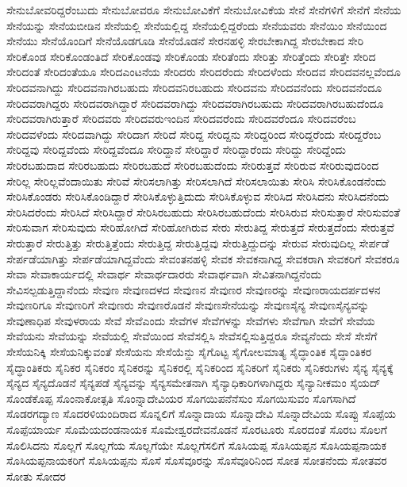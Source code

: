 {ಸೇನುಬೋವರಿದ್ದರೆಂಬುದು
ಸೇನುಬೋವರೂ
ಸೇನುಬೋವಿಕೆಗೆ
ಸೇನುಬೋವಿಕೆಯ
ಸೇನೆ
ಸೇನೆಗಳಿಗೆ
ಸೇನೆಗೆ
ಸೇನೆಯ
ಸೇನೆಯನ್ನು
ಸೇನೆಯಬೀಡಿನ
ಸೇನೆಯಲ್ಲಿ
ಸೇನೆಯಲ್ಲಿದ್ದ
ಸೇನೆಯಲ್ಲಿದ್ದರೆಂದು
ಸೇನೆಯವರು
ಸೇನೆಯಿಂ
ಸೇನೆಯಿಂದ
ಸೇನೆಯು
ಸೇನೆಯೊಂದಿಗೆ
ಸೇನೆಯೊಡಗೂಡಿ
ಸೇನೆಯೊಡನೆ
ಸೇರನಹಳ್ಳಿ
ಸೇರಬೇಕಾಗಿದ್ದ
ಸೇರಬೇಕಾದ
ಸೇರಿ
ಸೇರಿಕೊಂಡ
ಸೇರಿಕೊಂಡಂತಿದೆ
ಸೇರಿಕೊಂಡವು
ಸೇರಿಕೊಂಡು
ಸೇರಿತೆಂದು
ಸೇರಿತ್ತು
ಸೇರಿತ್ತೆಂದು
ಸೇರಿತ್ತೇ
ಸೇರಿದ
ಸೇರಿದಂತೆ
ಸೇರಿದಂತೆಯೂ
ಸೇರಿದಎಂಟನೆಯ
ಸೇರಿದರು
ಸೇರಿದರೆಂದು
ಸೇರಿದಳೆಂದು
ಸೇರಿದವ
ಸೇರಿದವನಲ್ಲವೆಂದೂ
ಸೇರಿದವನಾಗಿದ್ದು
ಸೇರಿದವನಾಗಿರಬಹುದು
ಸೇರಿದವನಿರಬಹುದು
ಸೇರಿದವನು
ಸೇರಿದವನೆಂದು
ಸೇರಿದವನೆಂದೂ
ಸೇರಿದವರಾಗಿದ್ದರು
ಸೇರಿದವರಾಗಿದ್ದಾರೆ
ಸೇರಿದವರಾಗಿದ್ದು
ಸೇರಿದವರಾಗಿರಬಹುದು
ಸೇರಿದವರಾಗಿರಬಹುದೆಂದೂ
ಸೇರಿದವರಾಗಿರುತ್ತಾರೆ
ಸೇರಿದವರು
ಸೇರಿದವರುಇಂದಿನ
ಸೇರಿದವರೆಂದು
ಸೇರಿದವರೆಂದೂ
ಸೇರಿದವರೆಂಬ
ಸೇರಿದವಳೆಂದು
ಸೇರಿದವಾಗಿದ್ದು
ಸೇರಿದಾಗ
ಸೇರಿದೆ
ಸೇರಿದ್ದ
ಸೇರಿದ್ದನು
ಸೇರಿದ್ದರಿಂದ
ಸೇರಿದ್ದರೆಂದು
ಸೇರಿದ್ದರೆಂಬ
ಸೇರಿದ್ದವು
ಸೇರಿದ್ದವೆಂದು
ಸೇರಿದ್ದವೆಂದೂ
ಸೇರಿದ್ದಾನೆ
ಸೇರಿದ್ದಾರೆ
ಸೇರಿದ್ದಾರೆಂದು
ಸೇರಿದ್ದು
ಸೇರಿದ್ದೆಂದು
ಸೇರಿರಬಹುದಾದ
ಸೇರಿರಬಹುದು
ಸೇರಿರಬಹುದೆ
ಸೇರಿರಬಹುದೆಂದು
ಸೇರಿರುತ್ತವೆ
ಸೇರಿರುವ
ಸೇರಿರುವುದರಿಂದ
ಸೇರಿಲ್ಲ
ಸೇರಿಲ್ಲವೆಂದಾಯಿತು
ಸೇರಿವೆ
ಸೇರಿಸಲಾಗಿತ್ತು
ಸೇರಿಸಲಾಗಿದೆ
ಸೇರಿಸಲಾಯಿತು
ಸೇರಿಸಿ
ಸೇರಿಸಿಕೊಂಡನೆಂದು
ಸೇರಿಸಿಕೊಂಡರು
ಸೇರಿಸಿಕೊಂಡಿದ್ದಾರೆ
ಸೇರಿಸಿಕೊಳ್ಳುತ್ತಿದುದು
ಸೇರಿಸಿಕೊಳ್ಳುವ
ಸೇರಿಸಿದ
ಸೇರಿಸಿದನು
ಸೇರಿಸಿದನೆಂದು
ಸೇರಿಸಿದರೆಂದು
ಸೇರಿಸಿದೆ
ಸೇರಿಸಿದ್ದಾರೆ
ಸೇರಿಸಿರಬಹುದು
ಸೇರಿಸಿರಬಹುದೆಂದು
ಸೇರಿಸಿರುವ
ಸೇರಿಸುತ್ತಾರೆ
ಸೇರಿಸುವಂತೆ
ಸೇರಿಸುವಾಗ
ಸೇರಿಸುವುದು
ಸೇರಿಹೋಗಿದೆ
ಸೇರಿಹೋಗಿರುವ
ಸೇರು
ಸೇರುತಿದ್ದ
ಸೇರುತ್ತದೆ
ಸೇರುತ್ತದೆಂದು
ಸೇರುತ್ತವೆ
ಸೇರುತ್ತಾರೆ
ಸೇರುತ್ತಿತ್ತು
ಸೇರುತ್ತಿತ್ತೆಂದು
ಸೇರುತ್ತಿದ್ದ
ಸೇರುತ್ತಿದ್ದವು
ಸೇರುತ್ತಿದ್ದುದನ್ನು
ಸೇರುವ
ಸೇರುವುದಿಲ್ಲ
ಸೇರ್ಪಡೆ
ಸೇರ್ಪಡೆಯಾಗಿತ್ತು
ಸೇರ್ಪಡೆಯಾಗಿದ್ದವೆಂದು
ಸೇವಂತನಹಳ್ಳಿ
ಸೇವಕ
ಸೇವಕನಾಗಿದ್ದ
ಸೇವಕರಾಗಿ
ಸೇವಕರಿಗೆ
ಸೇವಕರೂ
ಸೇವಾ
ಸೇವಾಕಾರ್ಯದಲ್ಲಿ
ಸೇವಾರ್ಥ
ಸೇವಾರ್ಥದಾರರು
ಸೇವಾರ್ಥವಾಗಿ
ಸೇವಿತನಾಗಿದ್ದನೆಂದು
ಸೇವಿಸಲ್ಪಡುತ್ತಿದ್ದಾನೆಂದು
ಸೇವುಣ
ಸೇವುಣದಳದ
ಸೇವುಣನ
ಸೇವುಣರ
ಸೇವುಣರನ್ನು
ಸೇವುಣರಾಯದರ್ಪದಳನ
ಸೇವುಣರಿಗೂ
ಸೇವುಣರಿಗೆ
ಸೇವುಣರು
ಸೇವುಣರೊಡನೆ
ಸೇವುಣಸೇನೆಯನ್ನು
ಸೇವುಣಸೈನ್ಯ
ಸೇವುಣಸೈನ್ಯವನ್ನು
ಸೇವುಣಾಧಿಪ
ಸೇವುಳರಾಯ
ಸೇವೆ
ಸೇವೆಎಂದು
ಸೇವೆಗಳ
ಸೇವೆಗಳನ್ನು
ಸೇವೆಗಳು
ಸೇವೆಗಾಗಿ
ಸೇವೆಗೆ
ಸೇವೆಯ
ಸೇವೆಯನು
ಸೇವೆಯನ್ನು
ಸೇವೆಯಲ್ಲಿ
ಸೇವೆಯಿಂದ
ಸೇವೆಸಲ್ಲಿಸಿ
ಸೇವೆಸಲ್ಲಿಸುತ್ತಿದ್ದರೂ
ಸೇವ್ಯನೆಂದು
ಸೇಸೆ
ಸೇಸೆಗೆ
ಸೇಸೆಯನಿಕ್ಕಿ
ಸೇಸೆಯನಿಕ್ಕುವಂತೆ
ಸೇಸೆಯನು
ಸೇಸೆಯೆನ್ದು
ಸೈಗೊಟ್ಟ
ಸೈಗೋಲಮಾತ್ಯ
ಸೈದ್ಧಾಂತಿಕ
ಸೈದ್ಧಾಂತಿಕರ
ಸೈದ್ಧಾಂತಿಕರು
ಸೈನಿಕರ
ಸೈನಿಕರಂ
ಸೈನಿಕರನ್ನು
ಸೈನಿಕರಲ್ಲಿ
ಸೈನಿಕರಿಂದ
ಸೈನಿಕರಿಗೆ
ಸೈನಿಕರು
ಸೈನಿಕರುಗಳು
ಸೈನ್ಯ
ಸೈನ್ಯಕ್ಕೆ
ಸೈನ್ಯದ
ಸೈನ್ಯದೊಡನೆ
ಸೈನ್ಯಪಡೆ
ಸೈನ್ಯವನ್ನು
ಸೈನ್ಯಸಮೇತನಾಗಿ
ಸೈನ್ಯಾಧಿಕಾರಿಗಳಾಗಿದ್ದರು
ಸೈನ್ಯಾನೀಕಮಂ
ಸೈಯದ್
ಸೊಂಡೆಕೊಪ್ಪ
ಸೊಂನಾಕೋತ್ಸತಿ
ಸೊಂನ್ನಾದೇವಿಯರ
ಸೊಗಯಿಪನೆನೆಸುಂ
ಸೊಗಯಿಸುವಂ
ಸೊಗಸಾಗಿದೆ
ಸೊಡರಗದ್ಯಾಣ
ಸೊದರಳಿಯಂದಿರಾದ
ಸೊನ್ನಲಿಗೆ
ಸೊನ್ನಾದಾಯ
ಸೊನ್ನಾದೇವಿ
ಸೊನ್ನಾದೇವಿಯ
ಸೊಪ್ಪು
ಸೊಪ್ಪೆಯ
ಸೊಪ್ಪೆಯಾರ್ಯ
ಸೊಮೆಯದಂಡನಾಯಕ
ಸೊಮೇಶ್ವರದೇವನೊಡನೆ
ಸೊರಟೂರು
ಸೊರದಂತೆ
ಸೊರಬ
ಸೊಲಗೆ
ಸೊಲಿಸಿದನು
ಸೊಲ್ಲಗೆ
ಸೊಲ್ಲಗೆಯ
ಸೊಲ್ಲಗೆಯೇ
ಸೊಲ್ಲಗೆಸಲಿಗೆ
ಸೊಸಿಯಪ್ಪ
ಸೊಸಿಯಪ್ಪನ
ಸೊಸಿಯಪ್ಪನಾಯಕ
ಸೊಸಿಯಪ್ಪನಾಯಕರಿಗೆ
ಸೊಸಿಯಪ್ಪನು
ಸೊಸೆ
ಸೊಸೆವೂರನ್ನು
ಸೊಸೆವೂರಿನಿಂದ
ಸೋತ
ಸೋತನೆಂದು
ಸೋತವರ
ಸೋತು
ಸೋದರ
}
